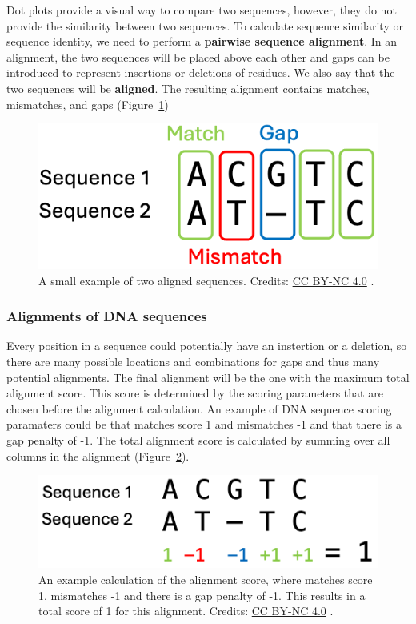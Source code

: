 Dot plots provide a visual way to compare two sequences, however, they do not provide the similarity between two sequences.
To calculate sequence similarity or sequence identity, we need to perform a \textbf{pairwise sequence alignment}.
In an alignment, the two sequences will be placed above each other and gaps can be introduced to represent insertions or deletions of residues.
We also say that the two sequences will be \textbf{aligned}.
The resulting alignment contains matches, mismatches, and gaps (Figure~\ref{algterm})

\begin{figure}[!htbp]
\centering
\includegraphics[width=0.5\linewidth]{files/alg_term-f276ccefbf1d202caaf7f23d7464dc58.png}
\caption[]{A small example of two aligned sequences.
Credits: \href{https://creativecommons.org/licenses/by-nc/4.0/}{CC BY-NC 4.0} \cite{own_2_2024}.}
\label{algterm}
\end{figure}

\subsubsection{Alignments of DNA sequences}

Every position in a sequence could potentially have an instertion or a deletion, so there are many possible locations and combinations for gaps and thus many potential alignments.
The final alignment will be the one with the maximum total alignment score.
This score is determined by the scoring parameters that are chosen before the alignment calculation.
An example of DNA sequence scoring paramaters could be that matches score 1 and mismatches -1 and that there is a gap penalty of -1.
The total alignment score is calculated by summing over all columns in the alignment (Figure~\ref{algscore}).

\begin{figure}[!htbp]
\centering
\includegraphics[width=0.6\linewidth]{files/alg_score-2bc8cb8229af1c45cf35062f015e5541.png}
\caption[]{An example calculation of the alignment score, where matches score 1, mismatches -1 and there is a gap penalty of -1.
This results in a total score of 1 for this alignment.
Credits: \href{https://creativecommons.org/licenses/by-nc/4.0/}{CC BY-NC 4.0} \cite{own_2_2024}.}
\label{algscore}
\end{figure}

